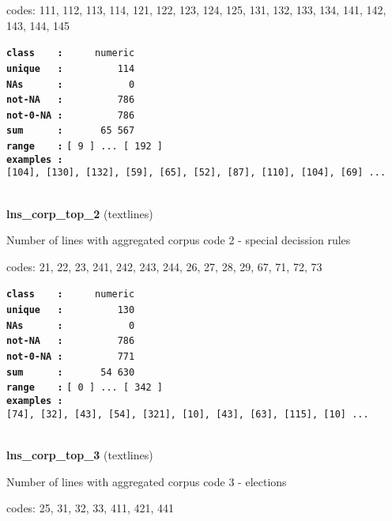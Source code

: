 \documentclass[]{article}
\begin{document}
codes: 111, 112, 113, 114, 121, 122, 123, 124, 125, 131, 132, 133, 134,
141, 142, 143, 144, 145

\textbf{\texttt{class\ \ \ \ :}} \texttt{~~~~~numeric}\\
\textbf{\texttt{unique\ \ \ :}} \texttt{~~~~~~~~~114}\\
\textbf{\texttt{NAs\ \ \ \ \ \ :}} \texttt{~~~~~~~~~~~0}\\
\textbf{\texttt{not-NA\ \ \ :}} \texttt{~~~~~~~~~786}\\
\textbf{\texttt{not-0-NA\ :}} \texttt{~~~~~~~~~786}\\
\textbf{\texttt{sum\ \ \ \ \ \ :}} \texttt{~~~~~~65~567}\\
\textbf{\texttt{range\ \ \ \ :}}
\texttt{{[}\ 9\ {]}\ ...\ {[}\ 192\ {]}}\\
\textbf{\texttt{examples\ :}}
\texttt{{[}104{]},\ {[}130{]},\ {[}132{]},\ {[}59{]},\ {[}65{]},\ {[}52{]},\ {[}87{]},\ {[}110{]},\ {[}104{]},\ {[}69{]}\ ...}\\

~

\textbf{lns\_corp\_top\_2} (textlines)

Number of lines with aggregated corpus code 2 - special decission rules

codes: 21, 22, 23, 241, 242, 243, 244, 26, 27, 28, 29, 67, 71, 72, 73

\textbf{\texttt{class\ \ \ \ :}} \texttt{~~~~~numeric}\\
\textbf{\texttt{unique\ \ \ :}} \texttt{~~~~~~~~~130}\\
\textbf{\texttt{NAs\ \ \ \ \ \ :}} \texttt{~~~~~~~~~~~0}\\
\textbf{\texttt{not-NA\ \ \ :}} \texttt{~~~~~~~~~786}\\
\textbf{\texttt{not-0-NA\ :}} \texttt{~~~~~~~~~771}\\
\textbf{\texttt{sum\ \ \ \ \ \ :}} \texttt{~~~~~~54~630}\\
\textbf{\texttt{range\ \ \ \ :}}
\texttt{{[}\ 0\ {]}\ ...\ {[}\ 342\ {]}}\\
\textbf{\texttt{examples\ :}}
\texttt{{[}74{]},\ {[}32{]},\ {[}43{]},\ {[}54{]},\ {[}321{]},\ {[}10{]},\ {[}43{]},\ {[}63{]},\ {[}115{]},\ {[}10{]}\ ...}\\

~

\textbf{lns\_corp\_top\_3} (textlines)

Number of lines with aggregated corpus code 3 - elections

codes: 25, 31, 32, 33, 411, 421, 441
\end{document}
